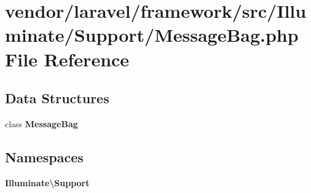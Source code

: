 \section{vendor/laravel/framework/src/\+Illuminate/\+Support/\+Message\+Bag.php File Reference}
\label{_support_2_message_bag_8php}
\subsection*{Data Structures}
\begin{DoxyCompactItemize}
\item 
class {\bf Message\+Bag}
\end{DoxyCompactItemize}
\subsection*{Namespaces}
\begin{DoxyCompactItemize}
\item 
 {\bf Illuminate\textbackslash{}\+Support}
\end{DoxyCompactItemize}
